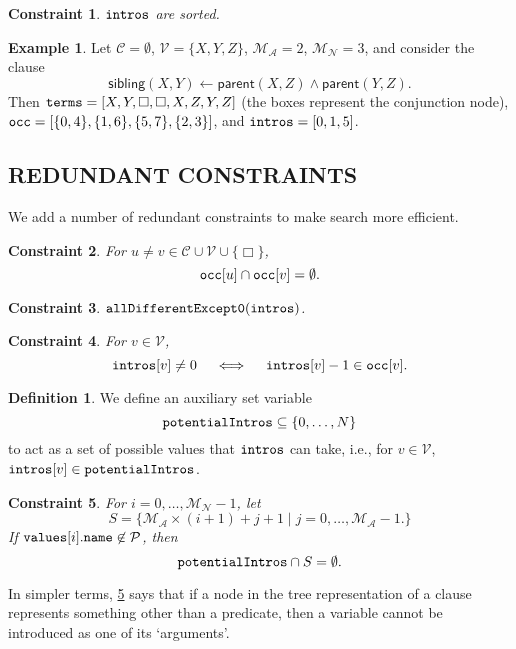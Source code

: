 \documentclass[letterpaper]{article}
\newtheorem{constraint}{Constraint}
\theoremstyle{definition}
\newtheorem{definition}{Definition}
\newtheorem{example}{Example}
\newcommand{\variable}[1]{\texttt{\textup{#1}}}
\newcommand{\predicates}{\mathcal{P}}
\newcommand{\variables}{\mathcal{V}}
\newcommand{\constants}{\mathcal{C}}
\newcommand{\maxArity}{\mathcal{M}_{\mathcal{A}}}
\newcommand{\maxNumNodes}{\mathcal{M}_{\mathcal{N}}}
\begin{document}
\begin{constraint}
  $\variable{intros}$ are sorted.
\end{constraint}

\begin{example}
  Let $\constants{} = \emptyset$, $\variables{} = \{ X, Y, Z \}$, $\maxArity{} =
  2$, $\maxNumNodes{} = 3$, and consider the clause
  \[
    \mathsf{sibling}(X, Y) \gets \mathsf{parent}(X, Z) \land
    \mathsf{parent}(Y, Z).
  \]
  Then $\variable{terms} = [X, Y, \Box, \Box, X, Z, Y, Z]$ (the boxes represent
  the conjunction node), $\variable{occ} = [\{ 0, 4 \}, \{ 1, 6 \},
  \{ 5, 7 \}, \{ 2, 3 \}]$, and $\variable{intros} = [0, 1, 5]$.
\end{example}

\subsection{REDUNDANT CONSTRAINTS}

We add a number of redundant constraints to make search more efficient.

\begin{constraint}
  For $u \ne v \in \constants{} \cup \variables{} \cup \{ \Box \}$,
  \[
    \variable{occ}[u] \cap \variable{occ}[v] = \emptyset.
  \]
\end{constraint}

\begin{constraint} \label{constraint:diffbutzero}
  $\variable{allDifferentExcept0}(\variable{intros})$.
\end{constraint}

\begin{constraint}
  For $v \in \variables{}$,
  \[
    \variable{intros}[v] \ne 0 \quad \iff \quad
    \variable{intros}[v] - 1 \in \variable{occ}[v].
  \]
\end{constraint}

\begin{definition}
  We define an auxiliary set variable
  \[
    \variable{potentialIntros} \subseteq \{ 0, \dots, N \}
  \]
  to act as a set of possible values that $\variable{intros}$ can take,
  i.e., for $v \in \variables{}$, $\variable{intros}[v] \in
  \variable{potentialIntros}$.
\end{definition}

\begin{constraint} \label{constraint:potentialIntroductions}
  For $i = 0, \dots, \maxNumNodes{} - 1$, let
  \[
    S = \{ \maxArity{} \times (i + 1) + j + 1 \mid j = 0, \dots, \maxArity{} - 1.
    \}
  \]
  If $\variable{values}[i].\variable{name} \not\in \predicates{}$, then
  \[
    \variable{potentialIntros} \cap S = \emptyset.
  \]
\end{constraint}
In simpler terms, \cref{constraint:potentialIntroductions} says that if a node
in the tree representation of a clause represents something other than a
predicate, then a variable cannot be introduced as one of its `arguments'.
\end{document}
